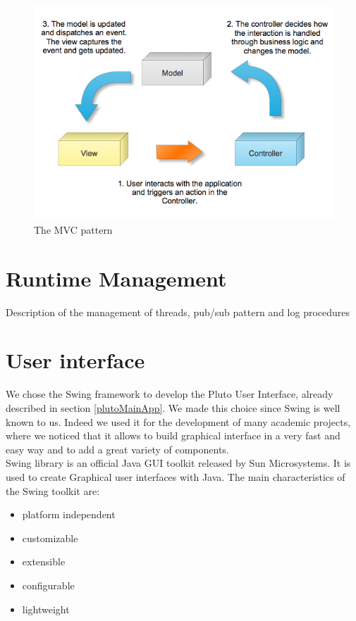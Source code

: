 \begin{figure}[H]
\centering
\includegraphics[width=\linewidth]
{pictures/MVC.png}
  \caption{The MVC pattern}
  \label{fig:mvc}
\end{figure}

\section{Runtime Management}\label{runtimeMng}

Description of the management of threads, pub/sub pattern and log procedures

\section{User interface}\label{interface}

We chose the Swing framework to develop the Pluto User Interface, already described in section \ref{plutoMainApp}.
We made this choice since Swing is well known to us.
Indeed we used it for the development of many academic projects, where we noticed that it allows to build graphical interface in a very fast and easy way and to add a great variety of components.
\\

Swing library is an official Java GUI toolkit released by Sun Microsystems. It is used to create Graphical user interfaces with Java.
The main characteristics of the Swing toolkit are:
\begin{itemize}
\item platform independent
\item customizable
\item extensible
\item configurable
\item lightweight
\end{itemize}

